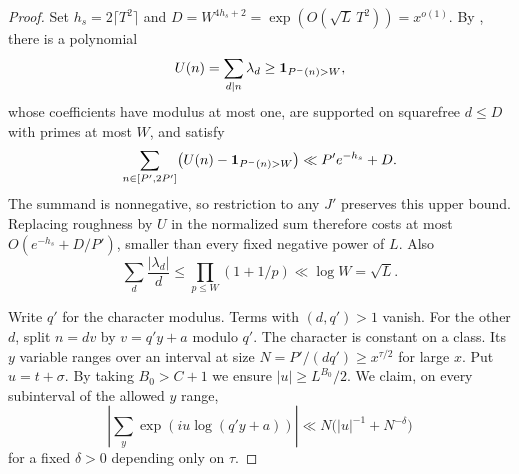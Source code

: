 \begin{proof}
Set $h_s=2\lceil T^2\rceil$ and
$D=W^{4h_s+2}=\exp(O(\sqrt L\,T^2))=x^{o(1)}$.
By , there is a polynomial
\[
 U(n)=\sum_{d\mid n}\lambda_d\geq\mathbf 1_{P^{-}(n)>W},
\]
whose coefficients have modulus at most one, are supported on
squarefree $d\leq D$ with primes at most $W$, and satisfy
\[
 \sum_{n\in[P',2P']}\bigl(U(n)-\mathbf 1_{P^{-}(n)>W}\bigr)
           \ll P'e^{-h_s}+D.
\]
The summand is nonnegative, so restriction to any $J'$ preserves
this upper bound. Replacing roughness by $U$ in the normalized
sum therefore costs at most $O(e^{-h_s}+D/P')$, smaller than every
fixed negative power of $L$. Also
\begin{equation}\label{eq:sieve-harmonic-cost}
 \sum_d\frac{|\lambda_d|}{d}
       \leq\prod_{p\leq W}(1+1/p)\ll\log W=\sqrt L.
\end{equation}

Write $q'$ for the character modulus. Terms with $(d,q')>1$ vanish.
For the other $d$, split $n=dv$ by $v=q'y+a$ modulo $q'$. The
character is constant on a class. Its $y$ variable ranges over an
interval at size
$N=P'/(dq')\geq x^{\tau/2}$ for large $x$.
Put $u=t+\sigma$. By taking $B_0>C+1$ we ensure
$|u|\geq L^{B_0}/2$. We claim, on every subinterval of the allowed
$y$ range,
\begin{equation}\label{eq:log-phase-sum}
 \left|\sum_y\exp(iu\log(q'y+a))\right|
                 \ll N\bigl(|u|^{-1}+N^{-\delta}\bigr)
\end{equation}
for a fixed $\delta>0$ depending only on $\tau$.


\end{proof}
